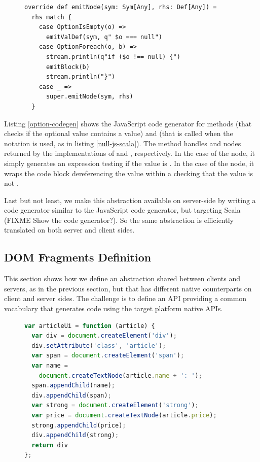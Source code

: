 \documentclass[preprint]{sigplanconf}
\begin{document}
\begin{figure}
\begin{lstlisting}[caption=JavaScript code generator for null references handling
DSL,label=option-codegen]
override def emitNode(sym: Sym[Any], rhs: Def[Any]) =
  rhs match {
    case OptionIsEmpty(o) =>
      emitValDef(sym, q" $o === null")
    case OptionForeach(o, b) =>
      stream.println(q"if ($o !== null) {")
      emitBlock(b)
      stream.println("}")
    case _ =>
      super.emitNode(sym, rhs)
  }
\end{lstlisting}
\end{figure}

Listing \ref{option-codegen} shows the JavaScript code generator for methods  (that
checks if the optional value contains a value) and  (that is called when the
 notation is used, as in listing \ref{null-js-scala}). The  method handles
 and  nodes returned by the implementations of
 and , respectively. In the case of the  node, it
simply generates an expression testing if the value is . In the case of the
 node, it wraps the code block dereferencing the value within a 
checking that the value is not .

Last but not least, we make this abstraction available on server-side by writing a code generator
similar to the JavaScript code generator, but targeting Scala (FIXME Show the code generator?). So
the same abstraction is efficiently translated on both server and client sides.

\subsection{DOM Fragments Definition}

This section shows how we define an abstraction shared between clients and servers, as in the
previous section, but that has different native counterparts on client and server sides. The
challenge is to define an API providing a common vocabulary that generates code using the target
platform native APIs.

\begin{figure}
\begin{lstlisting}[language=JavaScript,caption=JavaScript DOM API,label=dom-api]
var articleUi = function (article) {
  var div = document.createElement('div');
  div.setAttribute('class', 'article');
  var span = document.createElement('span');
  var name =
    document.createTextNode(article.name + ': ');
  span.appendChild(name);
  div.appendChild(span);
  var strong = document.createElement('strong');
  var price = document.createTextNode(article.price);
  strong.appendChild(price);
  div.appendChild(strong);
  return div
};
\end{lstlisting}
\end{figure}
\end{document}
